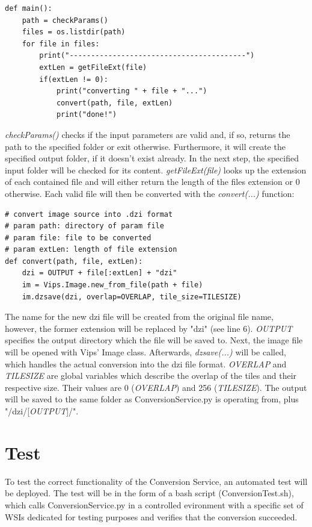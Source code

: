 \begin{lstlisting}[frame=single]
def main():
	path = checkParams()
	files = os.listdir(path)
	for file in files:
		print("-----------------------------------------")
		extLen = getFileExt(file)
		if(extLen != 0):
			print("converting " + file + "...")
			convert(path, file, extLen)
			print("done!")
\end{lstlisting}

\emph{checkParams()} checks if the input parameters are valid and, if so, returns the path to the specified folder or exit otherwise. Furthermore, it will create the specified output folder, if it doesn't exist already. In the next step, the specified input folder will be checked for its content. \emph{getFileExt(file)} looks up the extension of each contained file and will either return the length of the files extension or $0$ otherwise. Each valid file will then be converted with the \emph{convert(...)} function:

\begin{lstlisting}[frame=single]
# convert image source into .dzi format
# param path: directory of param file
# param file: file to be converted
# param extLen: length of file extension
def convert(path, file, extLen):
	dzi = OUTPUT + file[:extLen] + "dzi"
	im = Vips.Image.new_from_file(path + file)
	im.dzsave(dzi, overlap=OVERLAP, tile_size=TILESIZE)
\end{lstlisting}

The name for the new dzi file will be created from the original file name, however, the former extension will be replaced by "dzi" (see line 6). \emph{OUTPUT} specifies the output directory which the file will be saved to. Next, the image file will be opened with Vips' Image class. Afterwards, \emph{dzsave(...)} will be called, which handles the actual conversion into the dzi file format. \emph{OVERLAP} and \emph{TILESIZE} are global variables which describe the overlap of the tiles and their respective size. Their values are 0 (\emph{OVERLAP}) and 256 (\emph{TILESIZE}). The output will be saved to the same folder as ConversionService.py is operating from, plus "/dzi/[\emph{OUTPUT}]/".


\section{Test}

To test the correct functionality of the Conversion Service, an automated test will be deployed. The test will be in the form of a bash script (ConversionTest.sh), which calls ConversionService.py in a controlled evironment with a specific set of WSIs dedicated for testing purposes and verifies that the conversion succeeded.

